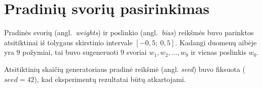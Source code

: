 \section{Pradinių svorių pasirinkimas}
\label{sec:pradiniu_svoriu_pasirinkimas}

Pradinės svorių (angl.~\textit{weights}) ir poslinkio (angl.~\textit{bias}) reikšmės buvo parinktos atsitiktinai iš tolygaus skirstinio intervale $[-0{,}5;\ 0{,}5]$. Kadangi duomenų aibėje yra $9$ požymiai, tai buvo sugeneruoti $9$ svoriai $w_1, w_2, \dots, w_9$ ir vienas poslinkis $w_0$.

Atsitiktinių skaičių generatoriaus pradinė reikšmė (angl. \textit{seed}) buvo fiksuota ($seed = 42$), kad eksperimentų rezultatai būtų atkartojami.